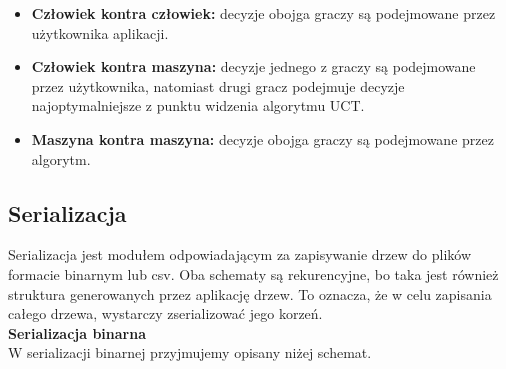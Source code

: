 \documentclass{article}
\begin{document}
	\begin{itemize}
		\item \textbf{Człowiek kontra człowiek:} decyzje obojga graczy są podejmowane przez użytkownika aplikacji.
		\item \textbf{Człowiek kontra maszyna:} decyzje jednego z graczy są podejmowane przez użytkownika, natomiast drugi gracz podejmuje decyzje najoptymalniejsze z punktu widzenia algorytmu UCT.
		\item \textbf{Maszyna kontra maszyna:} decyzje obojga graczy są podejmowane przez algorytm. \\ 
	\end{itemize}
	
	\clearpage
	
	\subsection{Serializacja}
	Serializacja jest modułem odpowiadającym za zapisywanie drzew do plików formacie binarnym lub csv. Oba schematy są rekurencyjne, bo taka jest również struktura generowanych przez aplikację drzew. To oznacza, że w celu zapisania całego drzewa, wystarczy zserializować jego korzeń.\\
	
	\noindent \textbf{\large Serializacja binarna} \\
	W serializacji binarnej przyjmujemy opisany niżej schemat.\\
\end{document}
